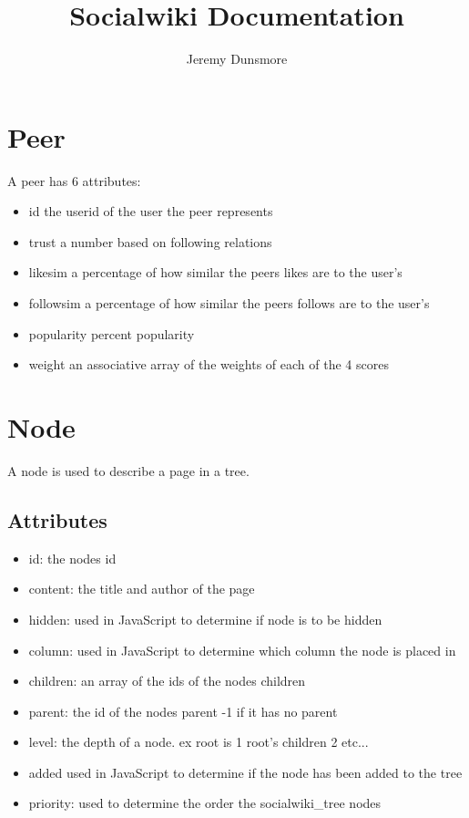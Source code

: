 \documentclass[letterpaper,twoside,11pt]{article}
\begin{document}


\title{Socialwiki Documentation}
\author{Jeremy Dunsmore}
\maketitle



\section{Peer}
 A peer has 6 attributes:
	\begin{itemize}
		\item id the userid of the user the peer represents
		\item	trust a number based on following relations
		\item	likesim a percentage of how similar the peers likes are to the user's
		\item	followsim a percentage of how similar the peers follows are to the user's
		\item popularity percent popularity
		\item weight an associative array of the weights of each of the 4 scores
	\end{itemize}

\section{Node}
A node is used to describe a page in a tree.
\subsection{Attributes}
\begin{itemize}
	\item id: the nodes id
	\item content: the title and author of the page
	\item hidden: used in JavaScript to determine if node is to be hidden
	\item column: used in JavaScript to determine which column the node is placed in
	\item children: an array of the ids of the nodes children
	\item parent: the id of the nodes parent -1 if it has no parent
	\item level: the depth of a node. ex root is 1 root's children 2 etc...
	\item added used in JavaScript to determine if the node has been added to the tree
	\item priority: used to determine the order the socialwiki\_tree nodes
\end{itemize}
\end{document}
